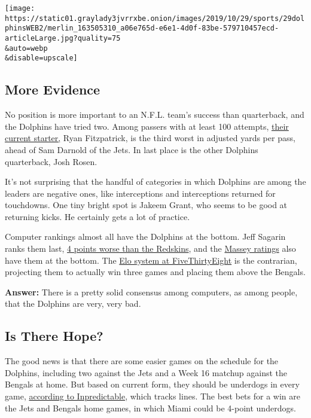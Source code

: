 \texttt{[image: https://static01.graylady3jvrrxbe.onion/images/2019/10/29/sports/29dolphinsWEB2/merlin\_163505310\_a06e765d-e6e1-4d0f-83be-579710457ecd-articleLarge.jpg?quality=75\\\&auto=webp\\\&disable=upscale]}

\hypertarget{more-evidence}{%
\subsection{More Evidence}\label{more-evidence}}

No position is more important to an N.F.L. team's success than
quarterback, and the Dolphins have tried two. Among passers with at
least 100 attempts,
\href{https://www.nytimes3xbfgragh.onion/2019/10/21/sports/football/backup-quarterback-teddy-bridgewater-mahomes.html}{their
current starter,} Ryan Fitzpatrick, is the third worst in adjusted yards
per pass, ahead of Sam Darnold of the Jets. In last place is the other
Dolphins quarterback, Josh Rosen.

It's not surprising that the handful of categories in which Dolphins are
among the leaders are negative ones, like interceptions and
interceptions returned for touchdowns. One tiny bright spot is Jakeem
Grant, who seems to be good at returning kicks. He certainly gets a lot
of practice.

Computer rankings almost all have the Dolphins at the bottom. Jeff
Sagarin ranks them last,
\href{https://www.usatoday.com/sports/nfl/sagarin/}{4 points worse than
the Redskins}, and the
\href{https://www.masseyratings.com/nfl/ratings}{Massey ratings} also
have them at the bottom. The
\href{https://projects.fivethirtyeight.com/2019-nfl-predictions/}{Elo
system at FiveThirtyEight} is the contrarian, projecting them to
actually win three games and placing them above the Bengals.

\textbf{Answer:} There is a pretty solid consensus among computers, as
among people, that the Dolphins are very, very bad.

\hypertarget{is-there-hope}{%
\subsection{Is There Hope?}\label{is-there-hope}}

The good news is that there are some easier games on the schedule for
the Dolphins, including two against the Jets and a Week 16 matchup
against the Bengals at home. But based on current form, they should be
underdogs in every game,
\href{http://stats.inpredictable.com/rankings/nfl.php}{according to
Inpredictable}, which tracks lines. The best bets for a win are the Jets
and Bengals home games, in which Miami could be 4-point underdogs.

